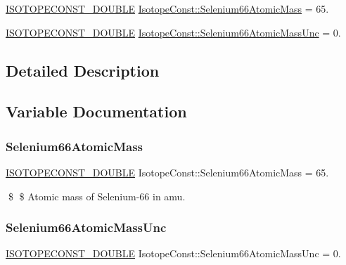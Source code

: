 \begin{DoxyCompactItemize}
\item 
\mbox{\hyperlink{group___isotope_const-_macros_ga8f45a7272ce02c0b4c65c44636ed719a}{I\+S\+O\+T\+O\+P\+E\+C\+O\+N\+S\+T\+\_\+\+D\+O\+U\+B\+LE}} \mbox{\hyperlink{group___isotope_const-_selenium-_se66_gae8b6860a654c74936cdfb6d1f12c9dc4}{Isotope\+Const\+::\+Selenium66\+Atomic\+Mass}} = 65.
\item 
\mbox{\hyperlink{group___isotope_const-_macros_ga8f45a7272ce02c0b4c65c44636ed719a}{I\+S\+O\+T\+O\+P\+E\+C\+O\+N\+S\+T\+\_\+\+D\+O\+U\+B\+LE}} \mbox{\hyperlink{group___isotope_const-_selenium-_se66_ga9096ebaee0378a004bfa65145fc25868}{Isotope\+Const\+::\+Selenium66\+Atomic\+Mass\+Unc}} = 0.
\end{DoxyCompactItemize}


\subsection{Detailed Description}


\subsection{Variable Documentation}
\mbox{\label{group___isotope_const-_selenium-_se66_gae8b6860a654c74936cdfb6d1f12c9dc4}} 
\subsubsection{\texorpdfstring{Selenium66\+Atomic\+Mass}{Selenium66AtomicMass}}
{\footnotesize\ttfamily \mbox{\hyperlink{group___isotope_const-_macros_ga8f45a7272ce02c0b4c65c44636ed719a}{I\+S\+O\+T\+O\+P\+E\+C\+O\+N\+S\+T\+\_\+\+D\+O\+U\+B\+LE}} Isotope\+Const\+::\+Selenium66\+Atomic\+Mass = 65.}

\$ \$ Atomic mass of Selenium-\/66 in amu. \mbox{\label{group___isotope_const-_selenium-_se66_ga9096ebaee0378a004bfa65145fc25868}} 
\subsubsection{\texorpdfstring{Selenium66\+Atomic\+Mass\+Unc}{Selenium66AtomicMassUnc}}
{\footnotesize\ttfamily \mbox{\hyperlink{group___isotope_const-_macros_ga8f45a7272ce02c0b4c65c44636ed719a}{I\+S\+O\+T\+O\+P\+E\+C\+O\+N\+S\+T\+\_\+\+D\+O\+U\+B\+LE}} Isotope\+Const\+::\+Selenium66\+Atomic\+Mass\+Unc = 0.}

